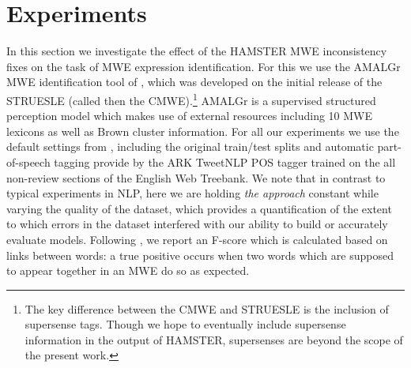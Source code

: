 \documentclass[output=paper
,modfonts
,nonflat]{langsci/langscibook}
\newcommand{\zp}{\phantom{0}}
\begin{document}

\section{Experiments}

In this section we investigate the effect of the HAMSTER MWE inconsistency fixes on the task of MWE expression identification. For this we use the AMALGr MWE identification tool of \citet{Schneider14b}, which was developed on the initial release of the STRUESLE (called then the CMWE).\footnote{The key difference between the CMWE and STRUESLE is the inclusion of supersense tags. Though we hope to eventually include supersense information in the output of HAMSTER, supersenses are beyond the scope of the present work.} AMALGr is a supervised structured perception model which makes use of external resources including 10 MWE lexicons as well as Brown cluster information. For all our experiments we use the default settings from \citet{Schneider14b}, including the original train/test splits and automatic part-of-speech tagging provide by the ARK TweetNLP POS tagger \citep{Owoputi13} trained on the all non-review sections of the English Web Treebank. We note that in contrast to typical experiments in NLP, here we are holding \textit{the approach} constant while varying the quality of the dataset, which provides a quantification of the extent to which errors in the dataset interfered with our ability to build or accurately evaluate models. Following \citet{Schneider14b}, we report an F-score which is calculated based on links between words: a true positive occurs when two words which are supposed to appear together in an MWE do so as expected.
\end{document}
